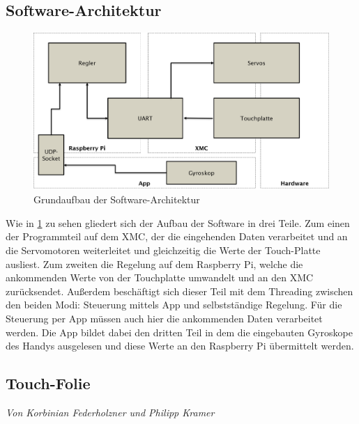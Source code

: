 \documentclass[12pt,a4paper,bibliography=totoc,listof=totoc]{scrartcl}
\begin{document}
\subsection{Software-Architektur}
\begin{figure}[htbp]
	\centering
	\includegraphics[scale = 0.5]{pics/SW_Architektur}
	\caption{Grundaufbau der Software-Architektur}
	\label{fig:SWarchitektur}
\end{figure}

Wie in \ref{fig:SWarchitektur} zu sehen gliedert sich der Aufbau der Software in drei Teile. Zum einen der 
Programmteil auf dem XMC, der die eingehenden Daten verarbeitet und an die Servomotoren weiterleitet und 
gleichzeitig die Werte der Touch-Platte ausliest. Zum zweiten die Regelung auf dem Raspberry Pi, welche 
die ankommenden Werte von der Touchplatte umwandelt und an den XMC zurücksendet. Außerdem beschäftigt sich 
dieser Teil mit dem Threading zwischen den beiden Modi: Steuerung mittels App und selbstständige Regelung.  
Für die Steuerung per App müssen auch hier die ankommenden Daten verarbeitet werden. Die App bildet dabei 
den dritten Teil in dem die eingebauten Gyroskope des Handys ausgelesen und diese Werte an den Raspberry Pi 
übermittelt werden.
\subsection{Touch-Folie} \label{subsec:Touch-Folie}
\textit{Von Korbinian Federholzner und Philipp Kramer}\newline
\end{document}
